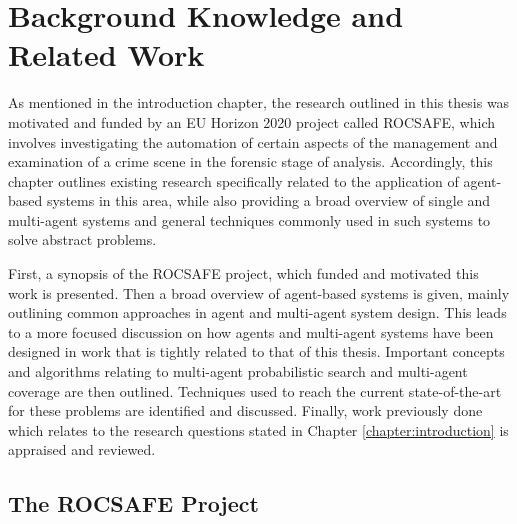 

\chapter{Background Knowledge and Related Work}\label{chapter:Background}

\workinprogress
As mentioned in the introduction chapter, the research outlined in this thesis was motivated and funded by an EU Horizon 2020 project called ROCSAFE, which involves investigating the automation of certain aspects of the management and examination of a crime scene in the forensic stage of analysis. Accordingly, this chapter outlines existing research specifically related to the application of agent-based systems in this area, while also providing a broad overview of single and multi-agent systems and general techniques commonly used in such systems to solve abstract problems. \par
First, a synopsis of the ROCSAFE project, which funded and motivated this work is presented. Then a broad overview of agent-based systems is given, mainly outlining common approaches in agent and multi-agent system design. This leads to a more focused discussion on how agents and multi-agent systems have been designed in work that is tightly related to that of this thesis. Important concepts and algorithms relating to multi-agent probabilistic search and multi-agent coverage are then outlined. Techniques used to reach the current state-of-the-art for these problems are identified and discussed. Finally, work previously done 
which relates to the research questions stated in Chapter \ref{chapter:introduction} is appraised and reviewed.

\section{The ROCSAFE Project}\label{sec:ROCSAFEBG}


